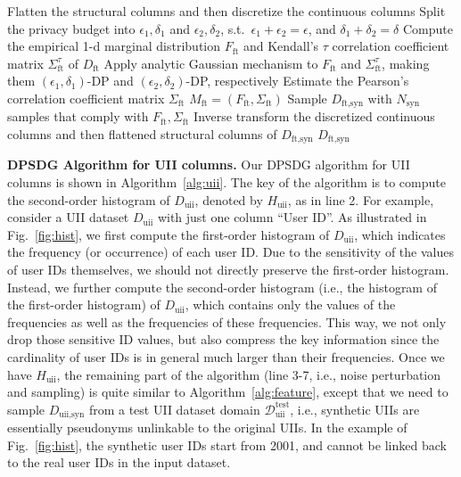 \documentclass[11pt]{article}
\begin{document}
\begin{algorithm}[h]
\caption{Differentially-Private Synthetic Data Generation for feature columns DPGCKendall1}
\label{alg:feature}
\begin{algorithmic}[1]
\State Flatten the structural columns and then discretize the continuous columns
\State Split the privacy budget into $\epsilon_1, \delta_1$ and $\epsilon_2, \delta_2$,
  s.t.\ $\epsilon_1 + \epsilon_2 = \epsilon$, and $\delta_1 + \delta_2 = \delta$
\State Compute the empirical 1-d marginal distribution $F_{\text{ft}}$ and
  Kendall's $\tau$ correlation coefficient matrix $\Sigma^{\tau}_{\text{ft}}$ of $D_{\text{ft}}$
\State Apply analytic Gaussian mechanism to $F_{\text{ft}}$ and $\Sigma^{\tau}_{\text{ft}}$,
  making them $(\epsilon_1,\delta_1)$-DP and $(\epsilon_2,\delta_2)$-DP, respectively
\State Estimate the Pearson's correlation coefficient matrix $\Sigma_{\text{ft}}$
\State \Return $M_{\text{ft}} = (F_{\text{ft}}, \Sigma_{\text{ft}})$
\EndProcedure
{}
\State Sample $D_{\text{ft},\text{syn}}$ with $N_{\text{syn}}$ samples that comply with $F_{\text{ft}}, \Sigma_{\text{ft}}$
\State Inverse transform the discretized continuous columns and then
  flattened structural columns of $D_{\text{ft},\text{syn}}$
\State \Return $D_{\text{ft},\text{syn}}$
\EndProcedure
\end{algorithmic}
\end{algorithm}

\textbf{DPSDG Algorithm for UII columns.} Our DPSDG algorithm
for UII columns is shown in Algorithm~\ref{alg:uii}. The key of the algorithm
is to compute the second-order histogram of $D_{\text{uii}}$, denoted by $H_{\text{uii}}$,
as in line 2. For example, consider a UII dataset $D_{\text{uii}}$ with just one
column ``User ID''. As illustrated in Fig.~\ref{fig:hist}, we first compute the
first-order histogram of $D_{\text{uii}}$, which indicates the frequency (or
occurrence) of each user ID. Due to the sensitivity of the values
of user IDs themselves, we should not directly preserve the first-order
histogram. Instead, we further compute the second-order
histogram (i.e., the histogram of the first-order histogram) of $D_{\text{uii}}$,
which contains only the values of the frequencies as well as the
frequencies of these frequencies. This way, we not only drop those
sensitive ID values, but also compress the key information since
the cardinality of user IDs is in general much larger than their
frequencies. Once we have $H_{\text{uii}}$, the remaining part of the algorithm
(line 3-7, i.e., noise perturbation and sampling) is quite similar to
Algorithm~\ref{alg:feature}, except that we need to sample $D_{\text{uii},\text{syn}}$ from a test UII
dataset domain $\mathcal{D}^{\text{test}}_{\text{uii}}$, i.e., synthetic UIIs are essentially pseudonyms
unlinkable to the original UIIs. In the example of Fig.~\ref{fig:hist}, the synthetic
user IDs start from 2001, and cannot be linked back to the real user
IDs in the input dataset.
\end{document}
